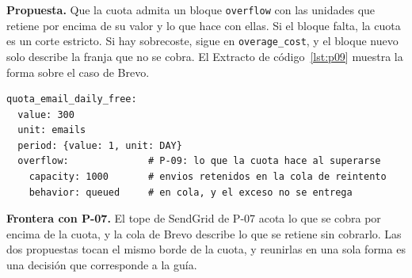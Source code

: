 \textbf{Propuesta.} Que la cuota admita un bloque \texttt{overflow} con las unidades que retiene por encima de su valor y lo que hace con ellas.
Si el bloque falta, la cuota es un corte estricto.
Si hay sobrecoste, sigue en \texttt{overage\_cost}, y el bloque nuevo solo describe la franja que no se cobra.
El Extracto de código~\ref{lst:p09} muestra la forma sobre el caso de Brevo.

\begin{lstlisting}[style=datasheetyaml,caption={P-09: una cuota que retiene lo que la supera hasta un tope fijo (caso Brevo, plan gratuito, correo transaccional).},label={lst:p09}]
quota_email_daily_free:
  value: 300
  unit: emails
  period: {value: 1, unit: DAY}
  overflow:              # P-09: lo que la cuota hace al superarse
    capacity: 1000       # envios retenidos en la cola de reintento
    behavior: queued     # en cola, y el exceso no se entrega
\end{lstlisting}

\textbf{Frontera con P-07.} El tope de SendGrid de P-07 acota lo que se cobra por encima de la cuota, y la cola de Brevo describe lo que se retiene sin cobrarlo.
Las dos propuestas tocan el mismo borde de la cuota, y reunirlas en una sola forma es una decisión que corresponde a la guía.

